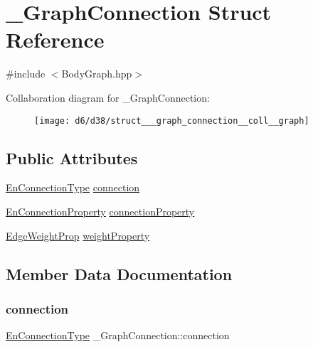 \hypertarget{struct___graph_connection}{}\section{\+\_\+\+Graph\+Connection Struct Reference}
\label{struct___graph_connection}


{\ttfamily \#include $<$Body\+Graph.\+hpp$>$}



Collaboration diagram for \+\_\+\+Graph\+Connection\+:\nopagebreak
\begin{figure}[H]
\begin{center}
\leavevmode
\texttt{[image: d6/d38/struct\_\_\_graph\_connection\_\_coll\_\_graph]}
\end{center}
\end{figure}
\subsection*{Public Attributes}
\begin{DoxyCompactItemize}
\item 
\mbox{\hyperlink{_body_graph_8hpp_a1a9cb52373e2881d50e8971ff4a37803}{En\+Connection\+Type}} \mbox{\hyperlink{struct___graph_connection_a3111812a1c3863ecfb33757dce869efe}{connection}}
\item 
\mbox{\hyperlink{_body_graph_8hpp_aaf075ead75a7b8171312447a8e13aab8}{En\+Connection\+Property}} \mbox{\hyperlink{struct___graph_connection_ab4f55b760335b06eb893f9abded06939}{connection\+Property}}
\item 
\mbox{\hyperlink{_body_graph_8hpp_aca4f327513ae6b3eeddfb5d9ccff4eb7}{Edge\+Weight\+Prop}} \mbox{\hyperlink{struct___graph_connection_a243a1a161c39bafe16a580f2fca162d1}{weight\+Property}}
\end{DoxyCompactItemize}


\subsection{Member Data Documentation}
\mbox{\label{struct___graph_connection_a3111812a1c3863ecfb33757dce869efe}} 
\subsubsection{\texorpdfstring{connection}{connection}}
{\footnotesize\ttfamily \mbox{\hyperlink{_body_graph_8hpp_a1a9cb52373e2881d50e8971ff4a37803}{En\+Connection\+Type}} \+\_\+\+Graph\+Connection\+::connection}

